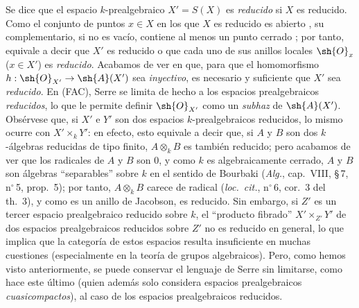 \begin{env}[10.10.4]
\label{IV.10.10.4}
Se dice que el espacio $k$-prealgebraico $X'=S(X)$ es \emph{reducido} si $X$ es reducido. Como el conjunto de puntos $x\in X$ en los que $X$ es reducido es abierto , su complementario, si no es vacío, contiene al menos un punto cerrado ; por tanto, equivale a decir que $X'$ es reducido o que cada uno de sus anillos locales $\sh{O}_x$ ($x\in X'$) es \emph{reducido}. Acabamos de ver en  que, para que el homomorfismo $h:\sh{O}_{X'}\to\sh{A}(X')$ sea \emph{inyectivo}, es necesario y suficiente que $X'$ sea \emph{reducido}.
En (FAC), Serre se limita de hecho a los espacios prealgebraicos \emph{reducidos}, lo que le permite definir $\sh{O}_{X'}$ como un \emph{subhaz} de $\sh{A}(X')$.
Obsérvese que, si $X'$ e $Y'$ son dos espacios $k$-prealgebraicos reducidos, lo mismo ocurre con $X'\times_k Y'$: en efecto, esto equivale a decir que, si $A$ y $B$ son dos $k$-álgebras reducidas de tipo finito, $A\otimes_k B$ es también reducido; pero acabamos de ver que los radicales de $A$ y $B$ son $0$, y como $k$ es algebraicamente cerrado, $A$ y $B$ son álgebras ``separables'' sobre $k$ en el sentido de Bourbaki (\emph{Alg.}, cap.~VIII, \S\,7, n$^\circ$\,5, prop.~5); por tanto, $A\otimes_k B$ carece de radical (\emph{loc.\ cit.}, n$^\circ$\,6, cor.~3 del th.~3), y como es un anillo de Jacobson, es reducido.
Sin embargo, si $Z'$ es un tercer espacio prealgebraico reducido sobre $k$, el ``producto fibrado'' $X'\times_{Z'}Y'$ de dos espacios prealgebraicos reducidos sobre $Z'$ no es reducido en general, lo que implica que la categoría de estos espacios resulta insuficiente en muchas cuestiones (especialmente en la teoría de grupos algebraicos).
Pero, como hemos visto anteriormente, se puede conservar el lenguaje de Serre sin limitarse, como hace este último (quien además solo considera espacios prealgebraicos \emph{cuasicompactos}), al caso de los espacios prealgebraicos reducidos.
\end{env}


